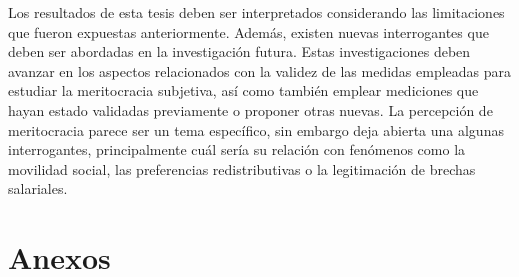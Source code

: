 \documentclass[12pt]{article}
\renewcommand{\baselinestretch}{1.5} %
\begin{document}
Los resultados de esta tesis deben ser interpretados considerando las limitaciones que fueron expuestas anteriormente. Además, existen nuevas interrogantes que deben ser abordadas en la investigación futura. Estas investigaciones deben avanzar en los aspectos relacionados con la validez de las medidas empleadas para estudiar la meritocracia subjetiva, así como también emplear mediciones que hayan estado validadas previamente o proponer otras nuevas. La percepción de meritocracia parece ser un tema específico, sin embargo deja abierta una algunas interrogantes, principalmente cuál sería su relación con fenómenos como la movilidad social, las preferencias redistributivas o la legitimación de brechas salariales.

\newpage 
\def\bibfont{\small}



\appendix

\section{Anexos}



\newpage

\renewcommand{\arraystretch}{1}
\renewcommand{\baselinestretch}{1} %

\restoregeometry

\renewcommand{\arraystretch}{1}
\renewcommand{\baselinestretch}{1} %

\restoregeometry

 	
\end{document}

